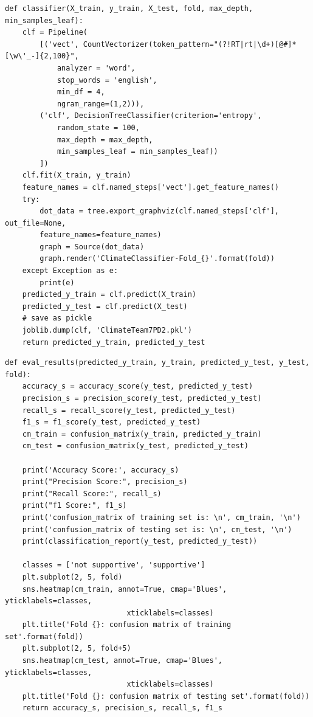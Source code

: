 \documentclass{article} %
\begin{document}
\lstset{language=Python}
\lstset{frame=lines}
\lstset{basicstyle=\footnotesize}
\begin{lstlisting}
def classifier(X_train, y_train, X_test, fold, max_depth, min_samples_leaf):
	clf = Pipeline(
		[('vect', CountVectorizer(token_pattern="(?!RT|rt|\d+)[@#]*[\w\'_-]{2,100}",
			analyzer = 'word',
			stop_words = 'english',
			min_df = 4,
			ngram_range=(1,2))),
		('clf', DecisionTreeClassifier(criterion='entropy',
			random_state = 100,
			max_depth = max_depth,
			min_samples_leaf = min_samples_leaf))
		])
	clf.fit(X_train, y_train)
	feature_names = clf.named_steps['vect'].get_feature_names()
	try:
		dot_data = tree.export_graphviz(clf.named_steps['clf'], out_file=None, 
		feature_names=feature_names)
		graph = Source(dot_data)
		graph.render('ClimateClassifier-Fold_{}'.format(fold))
	except Exception as e:
		print(e)
	predicted_y_train = clf.predict(X_train)
	predicted_y_test = clf.predict(X_test)
	# save as pickle
	joblib.dump(clf, 'ClimateTeam7PD2.pkl')
	return predicted_y_train, predicted_y_test
\end{lstlisting}


\lstset{language=Python}
\lstset{frame=lines}
\lstset{basicstyle=\footnotesize}
\begin{lstlisting}
def eval_results(predicted_y_train, y_train, predicted_y_test, y_test, fold):
	accuracy_s = accuracy_score(y_test, predicted_y_test)
	precision_s = precision_score(y_test, predicted_y_test)
	recall_s = recall_score(y_test, predicted_y_test)
	f1_s = f1_score(y_test, predicted_y_test)
	cm_train = confusion_matrix(y_train, predicted_y_train)
	cm_test = confusion_matrix(y_test, predicted_y_test)  
	
	print('Accuracy Score:', accuracy_s)
	print("Precision Score:", precision_s)
	print("Recall Score:", recall_s)
	print("f1 Score:", f1_s)
	print('confusion_matrix of training set is: \n', cm_train, '\n')
	print('confusion_matrix of testing set is: \n', cm_test, '\n')
	print(classification_report(y_test, predicted_y_test))
	
	classes = ['not supportive', 'supportive']
	plt.subplot(2, 5, fold)
	sns.heatmap(cm_train, annot=True, cmap='Blues', yticklabels=classes, 
							xticklabels=classes)
	plt.title('Fold {}: confusion matrix of training set'.format(fold))
	plt.subplot(2, 5, fold+5)
	sns.heatmap(cm_test, annot=True, cmap='Blues', yticklabels=classes, 
						 	xticklabels=classes)
	plt.title('Fold {}: confusion matrix of testing set'.format(fold))
	return accuracy_s, precision_s, recall_s, f1_s
\end{lstlisting}
\end{document}
